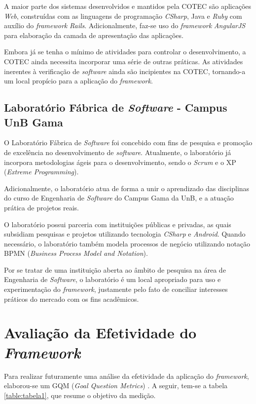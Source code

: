 A maior parte dos sistemas desenvolvidos e mantidos pela COTEC são aplicações \textit{Web}, construídas com as linguagens de programação \textit{CSharp}, Java e \textit{Ruby} com auxílio do \textit{framework} \textit{Rails}. Adicionalmente, faz-se uso do \textit{framework} \textit{AngularJS} para elaboração da camada de apresentação das aplicações.

Embora já se tenha o mínimo de atividades para controlar o desenvolvimento, a COTEC ainda necessita incorporar uma série de outras práticas. As atividades inerentes à verificação de \textit{software} ainda são incipientes na COTEC, tornando-a um local propício para a aplicação do \textit{framework}.

\subsection{Laboratório Fábrica de \textit{Software} - Campus UnB Gama}

O Laboratório Fábrica de \textit{Software} foi concebido com fins de pesquisa e promoção de excelência no desenvolvimento de \textit{software}. Atualmente, o laboratório já incorpora metodologias ágeis para o desenvolvimento, sendo o \textit{Scrum} e o XP (\textit{Extreme Programming}).

Adicionalmente, o laboratório atua de forma a unir o aprendizado das disciplinas do curso de Engenharia de \textit{Software} do Campus Gama da UnB, e a atuação prática de projetos reais.

O laboratório possui parceria com instituições públicas e privadas, as quais subsidiam pesquisas e projetos utilizando tecnologia \textit{CSharp} e \textit{Android}. Quando necessário, o laboratório também modela processos de negócio utilizando notação BPMN (\textit{Business Process Model and Notation}).

Por se tratar de uma instituição aberta ao âmbito de pesquisa na área de Engenharia de \textit{Software}, o laboratório é um local apropriado para uso e experimentação do \textit{framework}, justamente pelo fato de conciliar interesses práticos do mercado com os fins acadêmicos.

\section{Avaliação da Efetividade do \textit{Framework}}

Para realizar futuramente uma análise da efetividade da aplicação do \textit{framework}, elaborou-se um GQM (\textit{Goal Question Metrics}) \cite{gqm}. A seguir, tem-se a tabela \ref{table:tabela1}, que resume o objetivo da medição.

